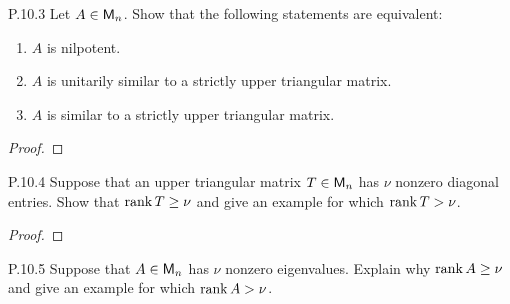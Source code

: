 \documentclass{../homework}
\begin{document}
\begin{problems}
\item[P.10.3] Let \(A \in \mathsf{M}_n\).  Show that the following statements
  are equivalent:
  \begin{enumerate}
  \item \(A\) is nilpotent.
  \item \(A\) is unitarily similar to a strictly upper triangular
    matrix.
  \item \(A\) is similar to a strictly upper triangular matrix.
  \end{enumerate}

  \begin{solution}
    \begin{proof}

    \end{proof}
  \end{solution}

\item[P.10.4] Suppose that an upper triangular matrix \(T \in \mathsf{M}_n\)
  has \(\nu\) nonzero diagonal entries.  Show that \(\operatorname{rank} T \ge \nu\)
  and give an example for which \(\operatorname{rank} T > \nu\).

  \begin{solution}
    \begin{proof}

    \end{proof}
  \end{solution}

\item[P.10.5] Suppose that \(A \in \mathsf{M}_n\) has \(\nu\) nonzero
  eigenvalues.  Explain why \(\operatorname{rank} A \ge \nu\) and give an example
  for which \(\operatorname{rank} A > \nu\).

  \begin{solution}

  \end{solution}
\end{problems}
\end{document}

